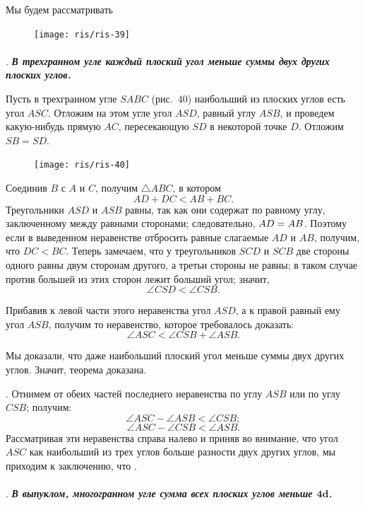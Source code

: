\documentclass[twoside]{book}
\begin{document}
Мы будем рассматривать 

\begin{figure}[h!]
\centering
\texttt{[image: ris/ris-39]}
\caption{}
\end{figure}

\paragraph{}\label{1938/s50}
.
\textbf{\emph{В трехгранном угле каждый плоский угол меньше суммы двух других плоских углов.}}

Пусть в трехгранном угле $SABC$ (рис.~40) наибольший из плоских углов есть угол $ASC$.
Отложим на этом угле угол $ASD$, равный углу $ASB$, и проведем какую-нибудь прямую $AC$, пересекающую $SD$ в некоторой точке $D$.
Отложим $SB=SD$.

\begin{figure}[h!]
\centering
\texttt{[image: ris/ris-40]}
\caption{}
\end{figure}

Соединив $B$ с $A$ и $C$, получим $\triangle ABC$, в котором
\[AD + DC < AB + BC.\]
Треугольники $ASD$ и $ASB$ равны, так как они содержат по равному углу, заключенному между равными сторонами;
следовательно, $AD \z=AB$.
Поэтому если в выведенном неравенстве отбросить равные слагаемые $AD$ и $AB$, получим, что $DC<BC$.
Теперь замечаем, что у треугольников $SCD$ и $SCB$ две стороны одного равны двум сторонам другого, а третьи стороны не равны;
в таком случае против большей из этих сторон лежит больший угол;
значит,
\[\angle CSD < \angle CSB.\]

Прибавив к левой части этого неравенства угол $ASD$, а к правой равный ему угол $ASB$, получим то неравенство, которое требовалось доказать:
\[\angle ASC < \angle CSB + \angle ASB.\]

Мы доказали, что даже наибольший плоский угол меньше суммы двух других углов.
Значит, теорема доказана.

.
Отнимем от обеих частей последнего неравенства по углу $ASB$ или по углу $CSB$;
получим:
\[\angle ASC - \angle ASB < \angle CSB;\]
\[\angle ASC - \angle CSB < \angle ASB.\]
Рассматривая эти неравенства справа налево и приняв во внимание, что угол $ASC$ как наибольший из трех углов больше разности двух других углов, мы приходим к заключению, что .

\paragraph{}\label{1938/s51}
.
\textbf{\emph{В выпуклом, многогранном угле сумма всех плоских углов меньше $\bm{4d}$.}}
\end{document}
